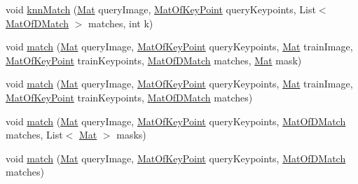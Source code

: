 \begin{DoxyCompactItemize}
\item 
void \mbox{\hyperlink{classorg_1_1opencv_1_1features2d_1_1_generic_descriptor_matcher_a66926e61feba1ba7562d6b23d1d49e28}{knn\+Match}} (\mbox{\hyperlink{classorg_1_1opencv_1_1core_1_1_mat}{Mat}} query\+Image, \mbox{\hyperlink{classorg_1_1opencv_1_1core_1_1_mat_of_key_point}{Mat\+Of\+Key\+Point}} query\+Keypoints, List$<$ \mbox{\hyperlink{classorg_1_1opencv_1_1core_1_1_mat_of_d_match}{Mat\+Of\+D\+Match}} $>$ matches, int k)
\item 
void \mbox{\hyperlink{classorg_1_1opencv_1_1features2d_1_1_generic_descriptor_matcher_ab02d6f8f1fa4c188b431bc6fcc5a4cac}{match}} (\mbox{\hyperlink{classorg_1_1opencv_1_1core_1_1_mat}{Mat}} query\+Image, \mbox{\hyperlink{classorg_1_1opencv_1_1core_1_1_mat_of_key_point}{Mat\+Of\+Key\+Point}} query\+Keypoints, \mbox{\hyperlink{classorg_1_1opencv_1_1core_1_1_mat}{Mat}} train\+Image, \mbox{\hyperlink{classorg_1_1opencv_1_1core_1_1_mat_of_key_point}{Mat\+Of\+Key\+Point}} train\+Keypoints, \mbox{\hyperlink{classorg_1_1opencv_1_1core_1_1_mat_of_d_match}{Mat\+Of\+D\+Match}} matches, \mbox{\hyperlink{classorg_1_1opencv_1_1core_1_1_mat}{Mat}} mask)
\item 
void \mbox{\hyperlink{classorg_1_1opencv_1_1features2d_1_1_generic_descriptor_matcher_af88c9bd04ba58ac1daf5a04e1c771a10}{match}} (\mbox{\hyperlink{classorg_1_1opencv_1_1core_1_1_mat}{Mat}} query\+Image, \mbox{\hyperlink{classorg_1_1opencv_1_1core_1_1_mat_of_key_point}{Mat\+Of\+Key\+Point}} query\+Keypoints, \mbox{\hyperlink{classorg_1_1opencv_1_1core_1_1_mat}{Mat}} train\+Image, \mbox{\hyperlink{classorg_1_1opencv_1_1core_1_1_mat_of_key_point}{Mat\+Of\+Key\+Point}} train\+Keypoints, \mbox{\hyperlink{classorg_1_1opencv_1_1core_1_1_mat_of_d_match}{Mat\+Of\+D\+Match}} matches)
\item 
void \mbox{\hyperlink{classorg_1_1opencv_1_1features2d_1_1_generic_descriptor_matcher_a03f59c4582495f33f1a08a0b3cfc7352}{match}} (\mbox{\hyperlink{classorg_1_1opencv_1_1core_1_1_mat}{Mat}} query\+Image, \mbox{\hyperlink{classorg_1_1opencv_1_1core_1_1_mat_of_key_point}{Mat\+Of\+Key\+Point}} query\+Keypoints, \mbox{\hyperlink{classorg_1_1opencv_1_1core_1_1_mat_of_d_match}{Mat\+Of\+D\+Match}} matches, List$<$ \mbox{\hyperlink{classorg_1_1opencv_1_1core_1_1_mat}{Mat}} $>$ masks)
\item 
void \mbox{\hyperlink{classorg_1_1opencv_1_1features2d_1_1_generic_descriptor_matcher_aee63b63a3294244e08d130a8c8391bb3}{match}} (\mbox{\hyperlink{classorg_1_1opencv_1_1core_1_1_mat}{Mat}} query\+Image, \mbox{\hyperlink{classorg_1_1opencv_1_1core_1_1_mat_of_key_point}{Mat\+Of\+Key\+Point}} query\+Keypoints, \mbox{\hyperlink{classorg_1_1opencv_1_1core_1_1_mat_of_d_match}{Mat\+Of\+D\+Match}} matches)

\end{DoxyCompactItemize}
